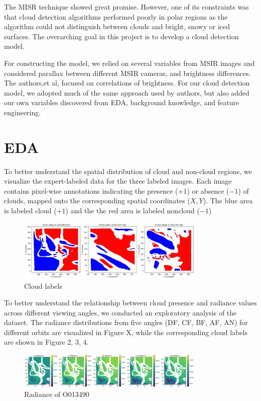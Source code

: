 \documentclass[10pt,letterpaper]{article}
\begin{document}
The MISR technique showed great promise. However, one of its constraints was that cloud detection algorithms performed poorly in polar regions as the algorithm could not distinguish between clouds and bright, snowy or iced surfaces. The overarching goal in this project is to develop a cloud detection model. 


For constructing the model, we relied on several variables from MSIR images and considered parallax between different MSIR cameras, and brightness differences. The authors,et al, focused on correlations of brightness. For our cloud detection model, we adopted much of the same approach used by authors, but also added our own variables discovered from EDA, background knowledge, and feature engineering. 

\section{EDA}

To better understand the spatial distribution of cloud and non-cloud regions, we visualize the expert-labeled data for the three labeled images. Each image contains pixel-wise annotations indicating the presence (\( +1 \)) or absence (\( -1 \)) of clouds, mapped onto the corresponding spatial coordinates (\(X, Y\)). The blue area is labeled cloud (\( +1 \)) and the the red area is labeled noncloud (\( -1 \))

\begin{figure}[H]
    \centering
    \includegraphics[width=0.8\textwidth]{labeled_cloud.png}
    \caption{Cloud labels}
    \label{Figure 1}
\end{figure}

To better understand the relationship between cloud presence and radiance values across different viewing angles, we conducted an exploratory analysis of the dataset. The radiance distributions from five angles (DF, CF, BF, AF, AN) for different orbits are visualized in Figure X, while the corresponding cloud labels are shown in Figure 2, 3, 4.

\begin{figure}[H]
    \centering
    \includegraphics[width=0.8\textwidth]{radiance_O013490.png}
    \caption{Radiance of O013490}
    \label{Figure 2}
\end{figure}
\end{document}
